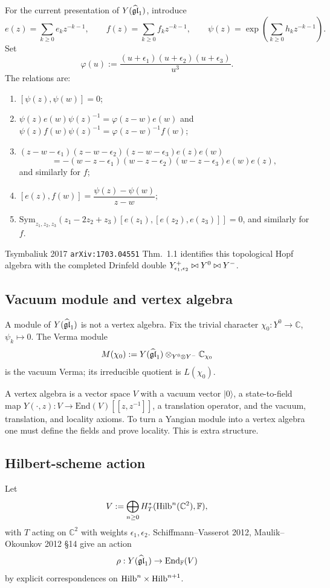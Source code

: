 For the current presentation of $Y(\widehat{\mathfrak{gl}}_1)$, introduce
\[
e(z)=\sum_{k\ge0}e_kz^{-k-1},\qquad
f(z)=\sum_{k\ge0}f_kz^{-k-1},\qquad
\psi(z)=\exp\!\left(\sum_{k\ge0}h_kz^{-k-1}\right).
\]
Set
\[
\varphi(u):=\frac{(u+\epsilon_1)(u+\epsilon_2)(u+\epsilon_3)}{u^3}.
\]
The relations are:
\begin{enumerate}[label=(R\arabic*)]
\item $[\psi(z),\psi(w)]=0$;
\item $\psi(z)e(w)\psi(z)^{-1}=\varphi(z-w)e(w)$ and
      $\psi(z)f(w)\psi(z)^{-1}=\varphi(z-w)^{-1}f(w)$;
\item $(z-w-\epsilon_1)(z-w-\epsilon_2)(z-w-\epsilon_3)e(z)e(w)$
      \[
      =-(w-z-\epsilon_1)(w-z-\epsilon_2)(w-z-\epsilon_3)e(w)e(z),
      \]
      and similarly for $f$;
\item $[e(z),f(w)]=\dfrac{\psi(z)-\psi(w)}{z-w}$;
\item $\mathrm{Sym}_{z_1,z_2,z_3}
      (z_1-2z_2+z_3)[e(z_1),[e(z_2),e(z_3)]]=0$,
      and similarly for $f$.
\end{enumerate}
Tsymbaliuk 2017 \texttt{arXiv:1703.04551} Thm.\ 1.1 identifies this
topological Hopf algebra with the completed Drinfeld double
$Y^+_{\epsilon_1, \epsilon_2}\bowtie Y^0\bowtie Y^-$.

\subsection{Vacuum module and vertex algebra}
\label{wn:subsec:yplus-vacuum-vs-vertex}

A module of $Y(\widehat{\mathfrak{gl}}_1)$ is not a vertex algebra. Fix the trivial
character $\chi_0:Y^0\to\mathbb C$, $\psi_k\mapsto0$. The Verma module
\[
M(\chi_0):=Y(\widehat{\mathfrak{gl}}_1)\otimes_{Y^0\otimes Y^-}\mathbb C_{\chi_0}
\]
is the vacuum Verma; its irreducible quotient is $L(\chi_0)$.

A vertex algebra is a vector space $V$ with a vacuum vector
$|0\rangle$, a state-to-field map
$Y(\cdot,z):V\to\mathrm{End}(V)[[z,z^{-1}]]$, a translation operator,
and the vacuum, translation, and locality axioms. To turn a Yangian
module into a vertex algebra one must define the fields and prove
locality. This is extra structure.

\subsection{Hilbert-scheme action}
\label{wn:subsec:yplus-MO-action}

Let
\[
V:=\bigoplus_{n\ge0}H^*_T(\mathrm{Hilb}^n(\mathbb C^2),\mathbb F),
\]
with $T$ acting on $\mathbb C^2$ with weights
$\epsilon_1,\epsilon_2$. Schiffmann--Vasserot 2012, Maulik--Okounkov
2012 §14 give an action
\[
\rho:Y(\widehat{\mathfrak{gl}}_1)\to\mathrm{End}_{\mathbb F}(V)
\]
by explicit correspondences on
$\mathrm{Hilb}^n\times\mathrm{Hilb}^{n+1}$.

